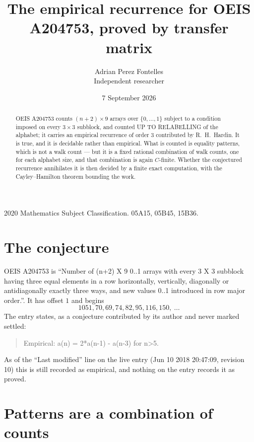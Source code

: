 \documentclass[11pt,a4paper]{article}
\title{The empirical recurrence for OEIS A204753, proved by transfer matrix}
\author{Adrian Perez Fontelles\\ \small Independent researcher}
\date{7 September 2026}
\theoremstyle{plain}
\theoremstyle{definition}
\begin{document}
\maketitle

\begin{abstract}
OEIS A204753 counts $(n+2)\times9$ arrays over $\{0,\dots,1\}$ subject to a condition imposed on
every $3\times3$ subblock, and counted UP TO RELABELLING of the
alphabet; it carries an empirical recurrence of order $3$ contributed by
R.~H.~Hardin. It is true, and it is decidable rather than empirical. What is counted is
equality patterns, which is not a walk count --- but it is a fixed rational combination of
walk counts, one for each alphabet size, and that combination is again $C$-finite. Whether the
conjectured recurrence annihilates it is then decided by a finite exact computation, with the
Cayley--Hamilton theorem bounding the work.
\end{abstract}

\noindent\small 2020 Mathematics Subject Classification. 05A15, 05B45, 15B36.\normalsize

\section{The conjecture}

OEIS A204753 is ``Number of (n+2) X 9 0..1 arrays with every 3 X 3 subblock having three equal elements in a row horizontally, vertically, diagonally or antidiagonally exactly three ways, and new values 0..1 introduced in row major order.''. It has offset $1$ and begins
\[
1051, 70, 69, 74, 82, 95, 116, 150,\ \dots
\]
The entry states, as a conjecture contributed by its author and never marked settled:
\begin{quote}
Empirical: a(n) = 2*a(n-1) - a(n-3) for n>5.
\end{quote}
As of the ``Last modified'' line on the live entry (Jun 10 2018 20:47:09, revision 10) this is still
recorded as empirical, and nothing on the entry records it as proved.

\section{Patterns are a combination of counts}
\end{document}
